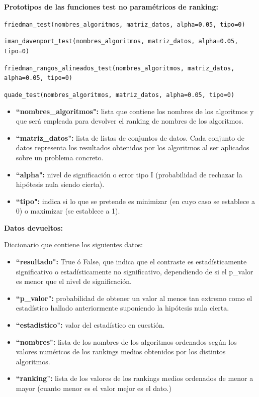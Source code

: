 \noindent
\textbf{Prototipos de las funciones test no paramétricos de ranking:}

\texttt{friedman\_test(nombres\_algoritmos, matriz\_datos, alpha=0.05, tipo=0)}

\texttt{iman\_davenport\_test(nombres\_algoritmos, matriz\_datos, alpha=0.05, tipo=0)}

\texttt{friedman\_rangos\_alineados\_test(nombres\_algoritmos, matriz\_datos, alpha=0.05, tipo=0)}

\texttt{quade\_test(nombres\_algoritmos, matriz\_datos, alpha=0.05, tipo=0)}

\begin{itemize}
\item \textbf{``nombres\_algoritmos":} lista que contiene los nombres de los algoritmos y que será empleada para devolver el ranking de nombres de los algoritmos.
\item \textbf{``matriz\_datos":} lista de listas de conjuntos de datos. Cada conjunto de datos representa los resultados obtenidos por los algoritmos al ser aplicados sobre un problema concreto.
\item \textbf{``alpha":} nivel de significación o error tipo I (probabilidad de rechazar la hipótesis nula siendo cierta).
\item \textbf{``tipo":} indica si lo que se pretende es minimizar (en cuyo caso se establece a 0) o maximizar (se establece a 1).
\end{itemize}

\noindent
\textbf{Datos devueltos:}

Diccionario que contiene los siguientes datos:

\begin{itemize}
\item \textbf{``resultado":} True ó False, que indica que el contraste es estadísticamente significativo o estadísticamente no significativo, dependiendo de si el p\_valor es menor que el nivel de significación.
\item \textbf{``p\_valor":} probabilidad de obtener un valor al menos tan extremo como el estadístico hallado anteriormente suponiendo la hipótesis nula cierta.
\item \textbf{``estadistico":} valor del estadístico en cuestión.
\item \textbf{``nombres":} lista de los nombres de los algoritmos ordenados según los valores numéricos de los rankings medios obtenidos por los distintos algoritmos.
\item \textbf{``ranking":} lista de los valores de los rankings medios ordenados de menor a mayor (cuanto menor es el valor mejor es el dato.)
\end{itemize}

